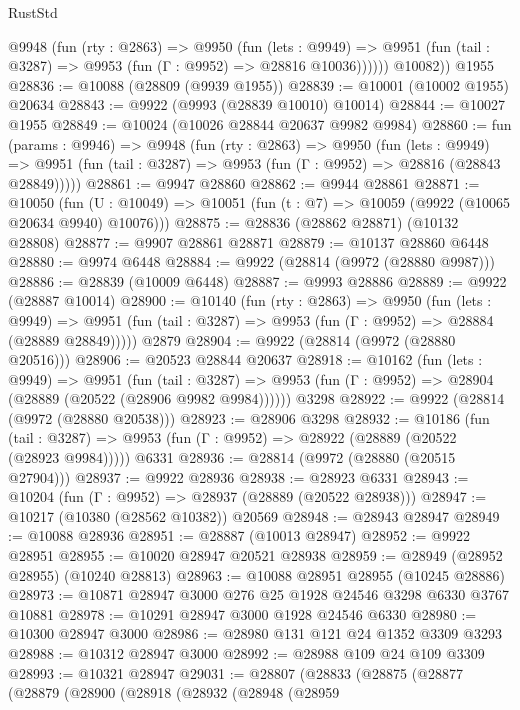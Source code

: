 \begin{lexlean}{RustStd}
\begin{coremodule}
          @9948
            (fun (rty : @2863) =>
            @9950
              (fun (lets : @9949) =>
              @9951 (fun (tail : @3287) => @9953 (fun (Γ : @9952) => @28816 @10036))))))
        @10082))
    @1955
@28836 := @10088 (@28809 (@9939 @1955))
@28839 := @10001 (@10002 @1955) @20634
@28843 := @9922 (@9993 (@28839 @10010) @10014)
@28844 := @10027 @1955
@28849 := @10024 (@10026 @28844 @20637 @9982 @9984)
@28860 := fun (params : @9946) =>
  @9948
    (fun (rty : @2863) =>
    @9950
      (fun (lets : @9949) =>
      @9951 (fun (tail : @3287) => @9953 (fun (Γ : @9952) => @28816 (@28843 @28849)))))
@28861 := @9947 @28860
@28862 := @9944 @28861
@28871 := @10050
    (fun (U : @10049) => @10051 (fun (t : @7) => @10059 (@9922 (@10065 @20634 @9940) @10076)))
@28875 := @28836 (@28862 @28871) (@10132 @28808)
@28877 := @9907 @28861 @28871
@28879 := @10137 @28860 @6448
@28880 := @9974 @6448
@28884 := @9922 (@28814 (@9972 (@28880 @9987)))
@28886 := @28839 (@10009 @6448)
@28887 := @9993 @28886
@28889 := @9922 (@28887 @10014)
@28900 := @10140
    (fun (rty : @2863) =>
    @9950
      (fun (lets : @9949) =>
      @9951 (fun (tail : @3287) => @9953 (fun (Γ : @9952) => @28884 (@28889 @28849)))))
    @2879
@28904 := @9922 (@28814 (@9972 (@28880 @20516)))
@28906 := @20523 @28844 @20637
@28918 := @10162
    (fun (lets : @9949) =>
    @9951
      (fun (tail : @3287) =>
      @9953 (fun (Γ : @9952) => @28904 (@28889 (@20522 (@28906 @9982 @9984))))))
    @3298
@28922 := @9922 (@28814 (@9972 (@28880 @20538)))
@28923 := @28906 @3298
@28932 := @10186
    (fun (tail : @3287) => @9953 (fun (Γ : @9952) => @28922 (@28889 (@20522 (@28923 @9984)))))
    @6331
@28936 := @28814 (@9972 (@28880 (@20515 @27904)))
@28937 := @9922 @28936
@28938 := @28923 @6331
@28943 := @10204 (fun (Γ : @9952) => @28937 (@28889 (@20522 @28938)))
@28947 := @10217 (@10380 (@28562 @10382)) @20569
@28948 := @28943 @28947
@28949 := @10088 @28936
@28951 := @28887 (@10013 @28947)
@28952 := @9922 @28951
@28955 := @10020 @28947 @20521 @28938
@28959 := @28949 (@28952 @28955) (@10240 @28813)
@28963 := @10088 @28951 @28955 (@10245 @28886)
@28973 := @10871 @28947 @3000 @276 @25 @1928 @24546 @3298 @6330 @3767 @10881
@28978 := @10291 @28947 @3000 @1928 @24546 @6330
@28980 := @10300 @28947 @3000
@28986 := @28980 @131 @121 @24 @1352 @3309 @3293
@28988 := @10312 @28947 @3000
@28992 := @28988 @109 @24 @109 @3309
@28993 := @10321 @28947
@29031 := @28807
    (@28833
      (@28875
        (@28877
          (@28879
            (@28900
              (@28918
                (@28932
                  (@28948
                    (@28959

\end{coremodule}
\end{lexlean}
